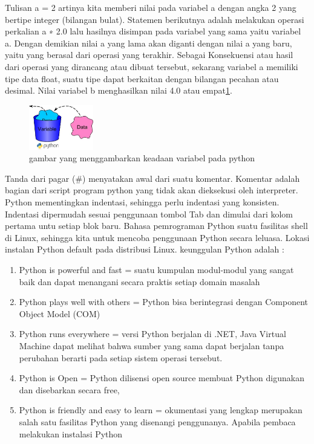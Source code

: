 Tulisan a = 2 artinya kita memberi nilai pada variabel a dengan angka 2 yang bertipe integer
(bilangan bulat). Statemen berikutnya adalah melakukan operasi perkalian a ∗ 2.0 lalu hasilnya
disimpan pada variabel yang sama yaitu variabel a. Dengan demikian nilai a yang lama
akan diganti dengan nilai a yang baru, yaitu yang berasal dari operasi yang terakhir.
Sebagai Konsekuensi atau hasil dari operasi yang dirancang atau dibuat tersebut, 
sekarang variabel a memiliki tipe data float, 
suatu tipe dapat berkaitan dengan bilangan pecahan atau desimal. 
Nilai variabel b menghasilkan nilai 4.0 atau empat\ref{pythonvariable}.
\begin{figure}[ht]
    \centerline{\includegraphics[width=0.25\textwidth]{figures/pythonvariable.png}}
    \caption{gambar yang menggambarkan keadaan variabel pada python}
    \label{pythonvariable}
    \end{figure}

Tanda dari pagar (\#) menyatakan awal dari suatu komentar. Komentar adalah bagian dari
script program python yang tidak akan dieksekusi oleh interpreter. 
Python mementingkan indentasi, sehingga perlu indentasi yang konsisten. Indentasi dipermudah sesuai penggunaan
tombol Tab dan dimulai dari kolom pertama untu setiap blok baru. 
Bahasa pemrograman Python suatu fasilitas  shell di Linux, sehingga kita untuk mencoba penggunaan
Python secara leluasa. Lokasi instalan Python default pada distribusi Linux.
keunggulan Python adalah :
\begin{enumerate}
\item
Python is powerful and fast = suatu kumpulan modul-modul yang sangat baik dan dapat menangani secara praktis setiap domain masalah
\item
Python plays well with others = Python bisa berintegrasi dengan Component Object Model (COM) 
\item
Python runs everywhere = versi Python berjalan di .NET, Java Virtual Machine dapat melihat bahwa sumber yang sama dapat berjalan tanpa perubahan berarti pada setiap sistem operasi tersebut.
\item
Python is Open = Python dilisensi open source membuat Python digunakan dan disebarkan secara free,
\item
Python is friendly and easy to learn = okumentasi yang lengkap merupakan salah satu fasilitas Python yang disenangi penggunanya. Apabila pembaca melakukan instalasi Python
\end{enumerate}

